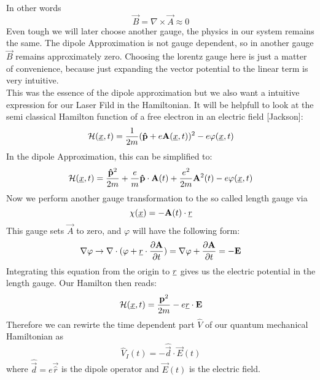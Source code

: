 In other words
\begin{equation*}
    \vec{B} = \nabla \times \vec{A} \approx 0
\end{equation*}
Even tough we will later choose another gauge, the physics in our system remains the same. The dipole Approximation is not gauge dependent, so in another gauge $\vec{B}$ remains approximately zero.
Choosing the lorentz gauge here is just a matter of convenience, because just expanding the vector potential to the linear term is very intuitive. \\
This was the essence of the dipole approximation but we also want a intuitive expression for our Laser Fild in the Hamiltonian.
It will be helpfull to look at the semi classical Hamilton function of a free electron in an electric field [Jackson]: %
\begin{equation*}
    \Hs(\uvec{x}, t) = \frac{1}{2m}(\vec{\hat{p}} + e \vec{A}(\uvec{x}, t))^2 - e \varphi(\uvec{x}, t) %
\end{equation*}
In the dipole Approximation, this can be simplified to:
\begin{equation*}
    \Hs(\uvec{x}, t) = \frac{\vec{\hat{p}}^2}{2m} + \frac{e}{m}\vec{\hat{p}}\cdot \vec{A}(t) + \frac{e^2}{2m}\vec{A}^2(t) - e \varphi(\uvec{x}, t) %
\end{equation*}
Now we perform another gauge transformation to the so called length gauge via 
\begin{equation*}
    \chi(\uvec{x}) = -\vec{A}(t)\cdot \uvec{r} %
\end{equation*}
This gauge sets $\vec{A}$ to zero, and $\varphi$ will have the following form:
\begin{equation*}
    \nabla \varphi \to \nabla \cdot (\varphi + \underline{r} \cdot \frac{\partial \mathbf{A}}{\partial t}) = \nabla \varphi + \frac{\partial \mathbf{A}}{\partial t} = - \mathbf{E}
\end{equation*}
Integrating this equation from the origin to $\underline{r}$ gives us the electric potential in the length gauge. Our Hamilton then reads:
\begin{equation*}
    \Hs(\uvec{x}, t) = \frac{\vec{p}^2}{2m} - e \uvec{r} \cdot \vec{E} %
\end{equation*}
Therefore we can rewirte the time dependent part $\hat{V}$ of our quantum mechanical Hamiltonian as
\begin{equation}
    \hat{V}_I(t) = -\hat{\vec{d}} \cdot \vec{E}(t) \label{eq:dipoleApprox}
\end{equation}
where $\hat{\vec{d}}=e\vec{\hat{r}}$ is the dipole operator and $\vec{E}(t)$ is the electric field.








